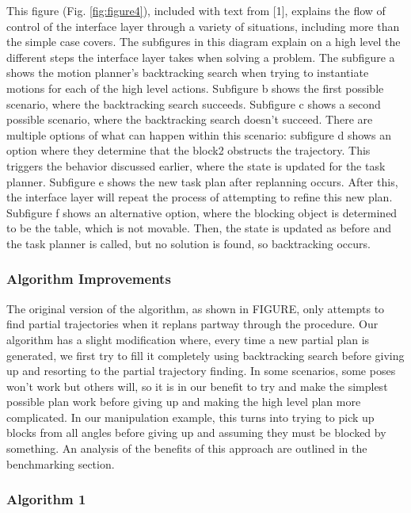 \documentclass[12pt]{article}
\begin{document}
This figure (Fig. \ref{fig:figure4}), included with text from [1], explains the flow of control of the interface layer through a variety of situations, including more than the simple case covers.  
The subfigures in this diagram explain on a high level the different steps the interface layer takes when solving a problem.  
The subfigure a shows the motion planner's backtracking search when trying to instantiate motions for each of the high level actions.  
Subfigure b shows the first possible scenario, where the backtracking search succeeds.  Subfigure c shows a second possible scenario, where the backtracking search doesn't succeed.  
There are multiple options of what can happen within this scenario: subfigure d shows an option where they determine that the block2 obstructs the trajectory.  
This triggers the behavior discussed earlier, where the state is updated for the task planner.  
Subfigure e shows the new task plan after replanning occurs.  
After this, the interface layer will repeat the process of attempting to refine this new plan.  
Subfigure f shows an alternative option, where the blocking object is determined to be the table, which is not movable.  
Then, the state is updated as before and the task planner is called, but no solution is found, so backtracking occurs.

\subsubsection{Algorithm Improvements}

The original version of the algorithm, as shown in FIGURE, only attempts to find partial trajectories when it replans partway through the procedure.  Our algorithm has a slight modification where, every time a new partial plan is generated, we first try to fill it completely using backtracking search before giving up and resorting to the partial trajectory finding.  In some scenarios, some poses won't work but others will, so it is in our benefit to try and make the simplest possible plan work before giving up and making the high level plan more complicated.  In our manipulation example, this turns into trying to pick up blocks from all angles before giving up and assuming they must be blocked by something.  An analysis of the benefits of this approach are outlined in the benchmarking section.  

\subsubsection{Algorithm 1}
\end{document}
